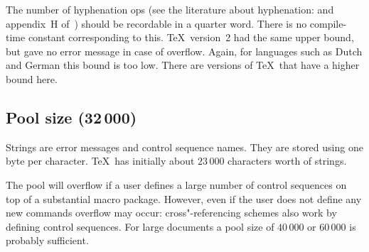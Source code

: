 The number of hyphenation ops (see the literature about
hyphenation: \cite{Liang} and appendix~H of~\cite{Knuth:TeXbook})
should be recordable 
in a quarter word. There is no compile-time constant corresponding
to this. \TeX\ version~2 had the same upper bound, but gave no
error message in case of overflow. Again, for languages such
as Dutch and German this bound is too low.
There are versions of \TeX\ that have a higher bound here.

\subsection{Pool size (32$\,$000)}

Strings are error messages and control sequence names.
They are stored using one byte per character.
\TeX\ has initially about $23\,000$ characters worth of
strings.

The pool will overflow if a user defines a large number of
control sequences on top of a substantial macro package.
However, even if the user does not define any new commands
\mdqon
overflow may occur: cross"-referencing schemes also
\mdqoff
work by defining control sequences. For large documents
a pool size of $40\,000$ or $60\,000$ is probably sufficient.

